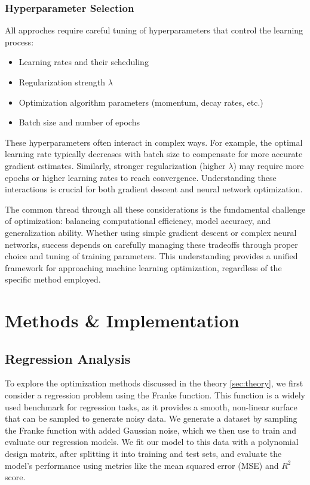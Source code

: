 \documentclass[aps,pra,english,notitlepage,reprint,nofootinbib]{revtex4-1}  %
\begin{document}
\subsubsection{Hyperparameter Selection}
All approches require careful tuning of hyperparameters that control the learning process:
\begin{itemize}
    \item Learning rates and their scheduling
    \item Regularization strength \( \lambda \)
    \item Optimization algorithm parameters (momentum, decay rates, etc.)
    \item Batch size and number of epochs
\end{itemize}

These hyperparameters often interact in complex ways. For example, the optimal learning rate typically decreases with batch size to compensate for more accurate gradient estimates. Similarly, stronger regularization (higher \( \lambda \)) may require more epochs or higher learning rates to reach convergence. Understanding these interactions is crucial for both gradient descent and neural network optimization.

The common thread through all these considerations is the fundamental challenge of optimization: balancing computational efficiency, model accuracy, and generalization ability. Whether using simple gradient descent or complex neural networks, success depends on carefully managing these tradeoffs through proper choice and tuning of training parameters. This understanding provides a unified framework for approaching machine learning optimization, regardless of the specific method employed.

\section{Methods \& Implementation}\label{sec:methods}
\subsection{Regression Analysis}
To explore the optimization methods discussed in the theory \cref{sec:theory}, we first consider a regression problem using the Franke function. This function is a widely used benchmark for regression tasks, as it provides a smooth, non-linear surface that can be sampled to generate noisy data. We generate a dataset by sampling the Franke function with added Gaussian noise, which we then use to train and evaluate our regression models. We fit our model to this data with a polynomial design matrix, after splitting it into training and test sets, and evaluate the model's performance using metrics like the mean squared error (MSE) and \( R^2 \) score.
\end{document}
